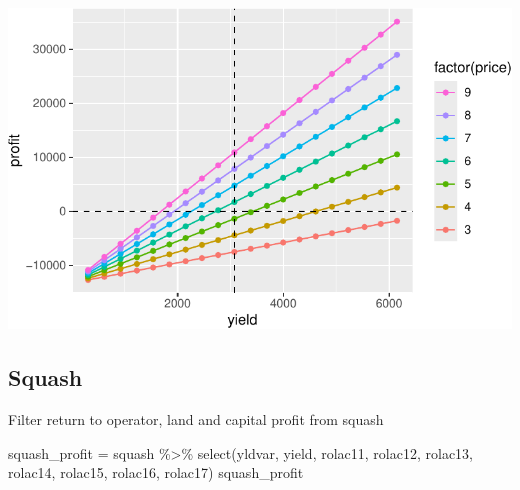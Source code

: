 \documentclass[
  letterpaper,
  DIV=11,
  numbers=noendperiod]{scrartcl}
\newenvironment{Shaded}{\begin{snugshade}}{\end{snugshade}}
\newcommand{\FunctionTok}[1]{\textcolor[rgb]{0.28,0.35,0.67}{#1}}
\newcommand{\NormalTok}[1]{\textcolor[rgb]{0.00,0.23,0.31}{#1}}
\newcommand{\OtherTok}[1]{\textcolor[rgb]{0.00,0.23,0.31}{#1}}
\newcommand{\SpecialCharTok}[1]{\textcolor[rgb]{0.37,0.37,0.37}{#1}}
\begin{document}
\includegraphics{Simulation_files/figure-pdf/unnamed-chunk-33-1.pdf}

\subsection{Squash}\label{squash-1}

Filter return to operator, land and capital profit from squash

\begin{Shaded}
\begin{Highlighting}[]
\NormalTok{squash\_profit }\OtherTok{=}\NormalTok{ squash }\SpecialCharTok{\%\textgreater{}\%} 
  \FunctionTok{select}\NormalTok{(yldvar, yield, }
\NormalTok{         rolac11, rolac12, rolac13, rolac14, }
\NormalTok{         rolac15, rolac16, rolac17)}
\NormalTok{squash\_profit}
\end{Highlighting}
\end{Shaded}
\end{document}
